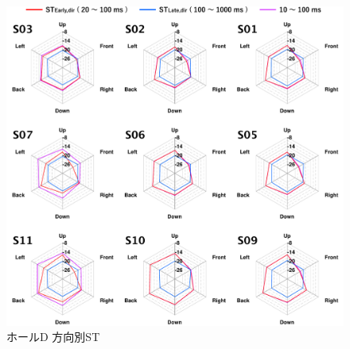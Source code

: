 \documentclass[11pt,a4j]{jreport}
\begin{document}
  \begin{figure}[H]
    \centering
    \includegraphics[scale=.77]{images/realHallDirSt/allPoint/reshaped/d.pdf}
    \caption*{ホールD 方向別ST}
  \end{figure}

  \newpage
\end{document}
